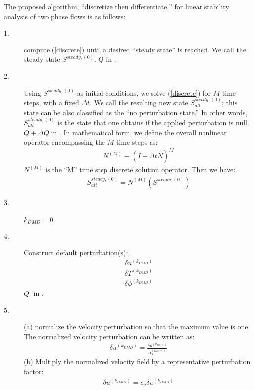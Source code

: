 \documentclass[]{article}
\begin{document}
The proposed algorithm, ``discretize then differentiate,''
for linear stability analysis of two phase flows is
as follows:
\begin{description}
	\item[1.] compute (\ref{discrete}) until a desired ``steady state'' is
		reached.  We call the steady state $S^{steady,(0)}$.
                $\bar{Q}$ in \cite{RANJAN2020109076}.
	\item[2.] Using $S^{steady,(0)}$ as initial conditions, we solve 
		(\ref{discrete}) for $M$ time steps, with a fixed $\Delta t$.
		We call the resulting new state 
		$S_{alt}^{steady,(0)}$; this state can be also classified
		as the ``no perturbation state.''
		In other words,
		$S_{alt}^{steady,(0)}$ 
		is the state that one obtains if the
		applied perturbation is null.  
                $\bar{Q}+\Delta \bar{Q}$ in \cite{RANJAN2020109076}.
                In mathematical form,
                we define the overall 
                nonlinear operator encompassing the $M$ time steps as:
                \begin{eqnarray}
	           N^{(M)}\equiv (I+\Delta t \tilde{N})^{M}
                \end{eqnarray}
                $N^{(M)}$ is the ``M'' time step discrete solution operator.
		Then we have:
                \begin{eqnarray}
		S_{alt}^{steady,(0)}=N^{(M)}(S^{steady,(0)})
                \end{eqnarray}


        \item[3.] $k_{DMD}=0$
        \item[4.] Construct default perturbation(s):
                \begin{eqnarray}
                \delta u^{(k_{DMD})}
                \end{eqnarray}
                \begin{eqnarray}
                \delta T^{(k_{DMD})}
                \end{eqnarray}
                \begin{eqnarray}
                \delta \phi^{(k_{DMD})}
                \end{eqnarray}
                $Q^{\prime}$ in \cite{RANJAN2020109076}.

 
	\item[5.] (a) normalize the velocity perturbation 
		so that the maximum value is one.  The normalized velocity
		perturbation can be written as:
                \begin{eqnarray}
			\delta u^{(k_{DMD})}=
			\frac{\delta u^{(k_{DMD})}}
			{\alpha_{u}^{(k_{DMD})}}
                \end{eqnarray}
		(b) Multiply the normalized velocity field by a representative
		perturbation factor:
                \begin{eqnarray}
			\delta u^{(k_{DMD})}=
			\epsilon_{u} \delta u^{(k_{DMD})}
                \end{eqnarray}


\end{description}
\end{document}
